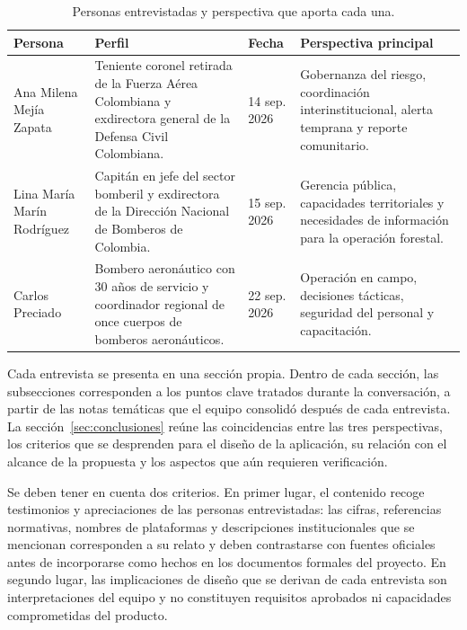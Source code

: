 \begin{table}[htbp]
\centering
\caption{Personas entrevistadas y perspectiva que aporta cada una.}
\label{tab:entrevistados}
\small
\renewcommand{\arraystretch}{1.15}
\begin{tabularx}{\textwidth}{|L{3.0cm}|Y|L{1.75cm}|Y|}
\hline
\textbf{Persona} & \textbf{Perfil} & \textbf{Fecha} & \textbf{Perspectiva principal} \\
\hline
Ana Milena Mejía Zapata & Teniente coronel retirada de la Fuerza Aérea Colombiana y exdirectora general de la Defensa Civil Colombiana. & 14 sep. 2026 & Gobernanza del riesgo, coordinación interinstitucional, alerta temprana y reporte comunitario. \\
\hline
Lina María Marín Rodríguez & Capitán en jefe del sector bomberil y exdirectora de la Dirección Nacional de Bomberos de Colombia. & 15 sep. 2026 & Gerencia pública, capacidades territoriales y necesidades de información para la operación forestal. \\
\hline
Carlos Preciado & Bombero aeronáutico con 30 años de servicio y coordinador regional de once cuerpos de bomberos aeronáuticos. & 22 sep. 2026 & Operación en campo, decisiones tácticas, seguridad del personal y capacitación. \\
\hline
\end{tabularx}
\end{table}

Cada entrevista se presenta en una sección propia. Dentro de cada sección, las subsecciones corresponden a los puntos clave tratados durante la conversación, a partir de las notas temáticas que el equipo consolidó después de cada entrevista. La sección~\ref{sec:conclusiones} reúne las coincidencias entre las tres perspectivas, los criterios que se desprenden para el diseño de la aplicación, su relación con el alcance de la propuesta y los aspectos que aún requieren verificación.

Se deben tener en cuenta dos criterios. En primer lugar, el contenido recoge testimonios y apreciaciones de las personas entrevistadas: las cifras, referencias normativas, nombres de plataformas y descripciones institucionales que se mencionan corresponden a su relato y deben contrastarse con fuentes oficiales antes de incorporarse como hechos en los documentos formales del proyecto. En segundo lugar, las implicaciones de diseño que se derivan de cada entrevista son interpretaciones del equipo y no constituyen requisitos aprobados ni capacidades comprometidas del producto.

